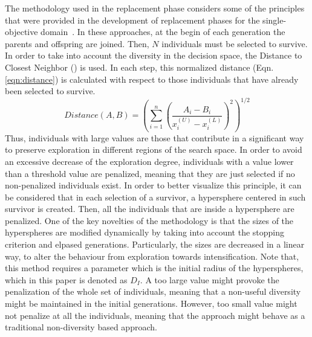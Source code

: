 The methodology used in the replacement phase considers some of the principles that were provided in the 
development of replacement phases for the single-objective domain~\cite{Joel:MULTI_DYNAMIC}.
%
%
In these approaches, at the begin of each generation the parents and offspring are joined.
%
Then, $N$ individuals must be selected to survive.
%
In order to take into account the diversity in the decision space, the 
Distance to Closest Neighbor (\DCN{}) is used.
%
In each step, this normalized distance (Eqn. \ref{eqn:distance}) is calculated with respect to those individuals that have already been selected to survive.
%
\begin{equation}\label{eqn:distance}
Distance(A, B) = \left (\sum_{i=1}^n \left ( \frac{A_i - B_i}{x_i^{(U)} - x_i^{(L)}} \right )^2  \right)^{1/2}
\end{equation}
Thus, individuals with large \DCN{} values are those that contribute in a significant way to preserve exploration in different regions of the search space.
%
In order to avoid an excessive decrease of the exploration degree, individuals with a \DCN{} value lower than a threshold value are penalized, meaning that
they are just selected if no non-penalized individuals exist.
%
In order to better visualize this principle, it can be considered that in each selection of a survivor, a hypersphere centered in such survivor is created.
%
Then, all the individuals that are inside a hypersphere are penalized.
%
One of the key novelties of the methodology is that the sizes of the hyperspheres are modified dynamically by taking into account the stopping criterion
and elpased generations.
%
Particularly, the sizes are decreased in a linear way, to alter the behaviour from exploration towards intensification.
%
Note that, this method requires a parameter which is the initial radius of the hyperspheres, which in this paper is denoted as $D_I$. 
%
A too large value might provoke the penalization of the whole set of individuals, meaning that a non-useful diversity might be maintained in the initial generations.
%
However, too small value might not penalize at all the individuals, meaning that the approach might behave as a traditional non-diversity based approach.

